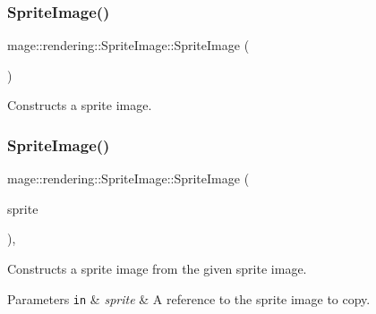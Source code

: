 \subsubsection{\texorpdfstring{Sprite\+Image()}{SpriteImage()}\hspace{0.1cm}{\footnotesize\ttfamily [1/3]}}
{\footnotesize\ttfamily mage\+::rendering\+::\+Sprite\+Image\+::\+Sprite\+Image (\begin{DoxyParamCaption}{ }\end{DoxyParamCaption})\hspace{0.3cm}{\ttfamily [noexcept]}}

Constructs a sprite image. \mbox{\label{classmage_1_1rendering_1_1_sprite_image_a788c62105830b6986a686c6f249c825d}} 
\subsubsection{\texorpdfstring{Sprite\+Image()}{SpriteImage()}\hspace{0.1cm}{\footnotesize\ttfamily [2/3]}}
{\footnotesize\ttfamily mage\+::rendering\+::\+Sprite\+Image\+::\+Sprite\+Image (\begin{DoxyParamCaption}\item[{const \mbox{\hyperlink{classmage_1_1rendering_1_1_sprite_image}{Sprite\+Image}} \&}]{sprite }\end{DoxyParamCaption})\hspace{0.3cm}{\ttfamily [default]}, {\ttfamily [noexcept]}}

Constructs a sprite image from the given sprite image.


\begin{DoxyParams}[1]{Parameters}
\mbox{\tt in}  & {\em sprite} & A reference to the sprite image to copy. \\
\hline
\end{DoxyParams}
\mbox{\label{classmage_1_1rendering_1_1_sprite_image_a267b1f56243e020f8cabef5d09c63cae}} 
